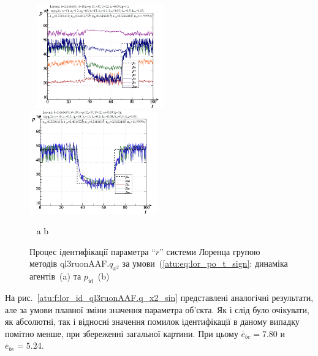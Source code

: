 \begin{figure}[ht!]
  \begin{center}
    ~ \hfill
    \includegraphics[width=0.49\textwidth]{p/cha/lor/ql3ruonAAF/lor_ql3ruonAAF_qy2-p_t_pi_sign.png}
    \hfill
    \includegraphics[width=0.49\textwidth]{p/cha/lor/ql3ruonAAF/lor_ql3ruonAAF_qy2-p_t_pz_sign.png}
    \hfill ~
  \end{center}
  \vspace{-1.0ex}
  \begin{center}
    ~ \hfill a \hfill\hfill b \hfill ~
  \end{center}
  \vspace{-1.5ex}
  \caption{Процес ідентифікації параметра ``$r$'' системи Лоренца групою методів ql3ruonAAF.$q_{x^2} $ за умови~(\ref{atu:eq:lor_po_t_sign}: динаміка агентів~(a) та $p_\mathrm{id}$~(b)}
\label{atu:f:lor_id_ql3ruonAAF.q_x2_sign}
\end{figure}


На рис.~\ref{atu:f:lor_id_ql3ruonAAF.q_x2_sin} представлені аналогічні результати,
але за умови плавної зміни значення параметра об'єкта. Як і слід
було очікувати, як абсолютні, так і відносні значення помилок
ідентифікації в даному випадку помітно менше, при збереженні
загальної картини. При цьому
$\overline{e}_{bc}=7.80$
и
$\overline{e}_{be}=5.24$.


